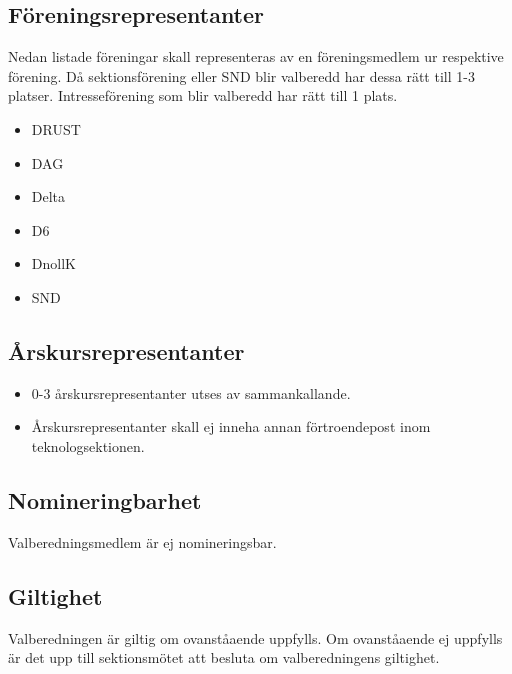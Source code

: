 \documentclass[a4paper, 10pt]{article}
\begin{document}
\subsection{Föreningsrepresentanter}
Nedan listade föreningar skall representeras av en föreningsmedlem ur respektive förening. Då sektionsförening eller SND blir valberedd har dessa rätt till 1-3 platser. Intresseförening som blir valberedd har rätt till 1 plats. 
\begin{itemize}
  \item DRUST 
  \item DAG 
  \item Delta 
  \item D6 
  \item DnollK 
  \item SND 
\end{itemize}
\subsection{Årskursrepresentanter}
\begin{itemize}
  \item 0-3 årskursrepresentanter utses av sammankallande. 
  \item Årskursrepresentanter skall ej inneha annan förtroendepost inom teknologsektionen. 
\end{itemize}
\subsection{Nomineringbarhet}
Valberedningsmedlem är ej nomineringsbar.
\subsection{Giltighet}
Valberedningen är giltig om ovanståaende uppfylls. Om ovanståaende ej uppfylls är det upp till sektionsmötet att besluta om valberedningens giltighet.
\end{document}
